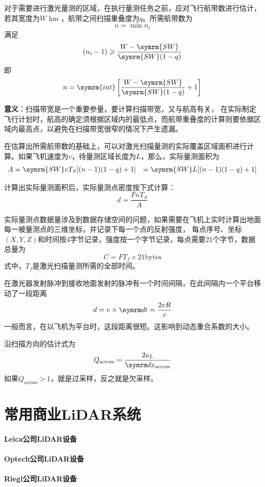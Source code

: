 对于需要进行激光量测的区域，在执行量测任务之前，应对飞行航带数进行估计，若其宽度为$ W $ km ，航带之间扫描重叠度为$ q $。所需航带数为
\begin{equation}
n = \min n_i
\end{equation}
满足
\begin{equation}
(n_i - 1) \geqslant \dfrac{W - \symrm{SW}}{\symrm{SW}(1-q)}
\end{equation}
即
\begin{equation}
n = \symrm{int} \left[ \dfrac{W - \symrm{SW}}{\symrm{SW}(1-q)} + 1\right]
\end{equation}

\textbf{意义}：扫描带宽是一个重要参量，要计算扫描带宽，又与航高有关，
在实际制定飞行计划时，航高的确定须根据区域内的最低点，而航带重叠度的计算则要依据区域内最高点，以避免在扫描带宽很窄的情况下产生遗漏。

在估算出所需航带数的基础上，可以对激光扫描量测的实际覆盖区域面积进行计算。如果飞机速度为$ v $，待量测区域长度为$ L $，那么，实际量测面积为
\begin{align}
A & = \symrm{SW} v T_S [(n - 1)(1 - q) + 1]
  & = \symrm{SW} L [(n - 1)(1 - q) + 1]
\end{align}

计算出实际量测面积后，实际量测点密度按下式计算：
\begin{equation}
d = \dfrac{FnT_S}{A}
\end{equation}

实际量测点数据量涉及到数据存储空间的问题，如果需要在飞机上实时计算出地面每一被量测点的三维坐标，并记录下每一个点的反射强度，
每点序号、坐标$ (X,Y,Z) $和时间按4字节记录，强度按一个字节记录，每点需要21个字节，数据总量为
\begin{equation}
C = FT_f \times 21 \text{bytes}
\end{equation}
式中，$ T_f $是激光扫描量测所需的全部时间。

在激光器发射脉冲到接收地面发射的脉冲有一个时间间隔，在此间隔内一个平台移动了一段距离
\begin{equation}
d = v \times \diff t = \dfrac{2vR}{c}
\end{equation}
一般而言，在以飞机为平台时，这段距离很短。这影响到动态重合系数的大小。

沿扫描方向的估计式为
\begin{equation}
Q_{\text{across}} = \dfrac{2a_L}{\diff x_{\text{across}}}
\end{equation}
如果$ Q_{\text{across}} > 1$，就是过采样，反之就是欠采样。

\section{常用商业LiDAR系统}
\paragraph{Leica公司LiDAR设备}
\paragraph{Optech公司LiDAR设备}
\paragraph{Riegl公司LiDAR设备}